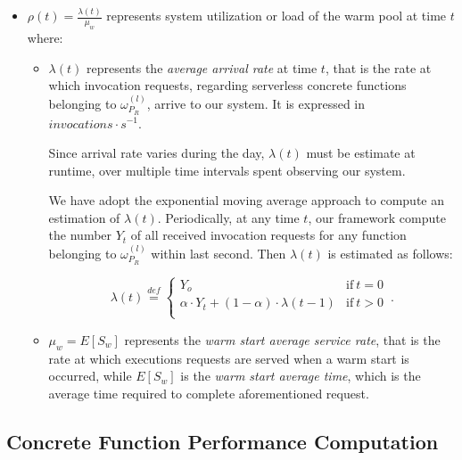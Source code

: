 \documentclass[12pt,a4paper]{report}
\newcommand{\mathDef}{\overset{\textit{def}}{=}}
\begin{document}
\begin{itemize}
	
	\item $\displaystyle \rho(t) = \frac{\lambda(t)}{\mu_{w}}$ represents system utilization or load of the warm pool at time $t$ where:
	
	\begin{itemize}
		
		\item $\lambda(t)$ represents the \textit{average arrival rate} at time $t$, that is the rate at which invocation requests, regarding serverless concrete functions belonging to $\omega_{P_R}^{(l)}$, arrive to our system. It is expressed in $invocations \cdot s^{-1}$.
				
		Since arrival rate varies during the day, $\lambda(t)$ must be estimate at runtime, over multiple time intervals spent observing our system.
		
		We have adopt the exponential moving average approach to compute an estimation of $\lambda(t)$. Periodically, at any time $t$, our framework compute the number $Y_t$ of all received invocation requests for any function belonging to $\omega_{P_R}^{(l)}$ within last second. Then $\lambda(t)$ is estimated as follows:
		
		\begin{equation}
			\lambda(t) \mathDef
			\begin{cases}
				Y_o & \text{if}\ t = 0\\ 
				\alpha \cdot Y_t + (1 - \alpha) \cdot \lambda(t-1) & \text{if}\ t > 0\\
				
			\end{cases}\,.
		\end{equation}
		
		\item $\mu_{w} = E[S_w]$ represents the \textit{warm start average service rate}, that is the rate at which executions requests are served when a warm start is occurred, while $E[S_w]$ is the \textit{warm start average time}, which is the average time required to complete aforementioned request.
		
	\end{itemize}
	
\end{itemize}


\subsection{Concrete Function Performance Computation}
\end{document}
